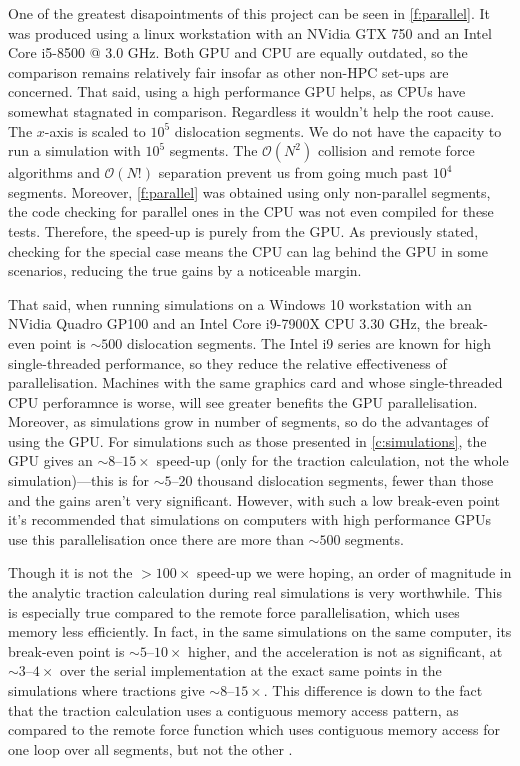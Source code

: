 One of the greatest disapointments of this project can be seen in \cref{f:parallel}. It was produced using a linux workstation with an NVidia GTX 750 and an Intel Core i5-8500 @ 3.0 GHz. Both GPU and CPU are equally outdated, so the comparison remains relatively fair insofar as other non-HPC set-ups are concerned. That said, using a high performance GPU helps, as CPUs have somewhat stagnated in comparison. Regardless it wouldn't help the root cause. The $x$-axis is scaled to $10^5$ dislocation segments. We do not have the capacity to run a simulation with $10^5$ segments. The $\mathcal{O}(N^2)$ collision and remote force algorithms and $\mathcal{O}(N!)$ separation prevent us from going much past $10^4$ segments. Moreover, \cref{f:parallel} was obtained using only non-parallel segments, the code checking for parallel ones in the CPU was not even compiled for these tests. Therefore, the speed-up is purely from the GPU. As previously stated, checking for the special case means the CPU can lag behind the GPU in some scenarios, reducing the true gains by a noticeable margin.

That said, when running simulations on a Windows 10 workstation with an NVidia Quadro GP100 and an Intel Core i9-7900X CPU \@ 3.30 GHz, the break-even point is $\sim 500$ dislocation segments. The Intel i9 series are known for high single-threaded performance, so they reduce the relative effectiveness of parallelisation. Machines with the same graphics card and whose single-threaded CPU perforamnce is worse, will see greater benefits the GPU parallelisation. Moreover, as simulations grow in number of segments, so do the advantages of using the GPU. For simulations such as those presented in \cref{c:simulations}, the GPU gives an $\sim 8$--$15\times$ speed-up (only for the traction calculation, not the whole simulation)---this is for $\sim 5$--$20$ thousand dislocation segments, fewer than those and the gains aren't very significant. However, with such a low break-even point it's recommended that simulations on computers with high performance GPUs use this parallelisation once there are more than $\sim 500$ segments.

Though it is not the $>100\times$ speed-up we were hoping, an order of magnitude in the analytic traction calculation during real simulations is very worthwhile. This is especially true compared to the remote force parallelisation, which uses memory less efficiently. In fact, in the same simulations on the same computer, its break-even point is $\sim 5$--$10\times$ higher, and the acceleration is not as significant, at $\sim 3$--$4 \times$ over the serial implementation at the exact same points in the simulations where tractions give $\sim 8$--$15\times$. This difference is down to the fact that the traction calculation uses a contiguous memory access pattern, as compared to the remote force function which uses contiguous memory access for one loop over all segments, but not the other \cite{gpu_ddd}.

